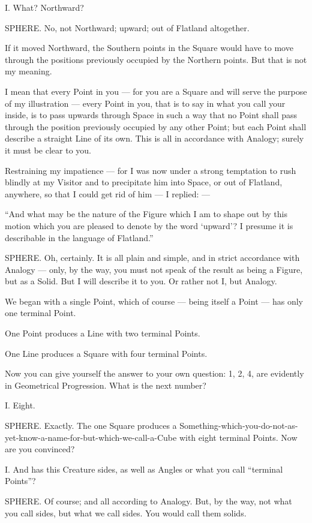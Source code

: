 \documentclass[12pt, a4paper, twoside]{memoir}
\begin{document}
I. What? Northward?

SPHERE. No, not Northward; upward; out of Flatland altogether.

If it moved Northward, the Southern points in the Square would have to move
through the positions previously occupied by the Northern points. But that is
not my meaning.

I mean that every Point in you --- for you are a Square and will serve the
purpose of my illustration --- every Point in you, that is to say in what you
call your inside, is to pass upwards through Space in such a way that no Point
shall pass through the position previously occupied by any other Point; but
each Point shall describe a straight Line of its own. This is all in
accordance with Analogy; surely it must be clear to you.

Restraining my impatience --- for I was now under a strong temptation to rush
blindly at my Visitor and to precipitate him into Space, or out of Flatland,
anywhere, so that I could get rid of him --- I replied: ---

``And what may be the nature of the Figure which I am to shape out by this
motion which you are pleased to denote by the word `upward'? I presume it is
describable in the language of Flatland.''

SPHERE. Oh, certainly. It is all plain and simple, and in strict accordance
with Analogy --- only, by the way, you must not speak of the result as being a
Figure, but as a Solid. But I will describe it to you. Or rather not I, but
Analogy.

We began with a single Point, which of course --- being itself a Point --- has
only one terminal Point.

One Point produces a Line with two terminal Points.

One Line produces a Square with four terminal Points.

Now you can give yourself the answer to your own question: 1, 2, 4, are
evidently in Geometrical Progression. What is the next number?

I. Eight.

SPHERE. Exactly. The one Square produces a
Something-which-you-do-not-as-yet-know-a-name-for-but-which-we-call-a-Cube
with eight terminal Points. Now are you convinced?

I. And has this Creature sides, as well as Angles or what you call ``terminal
Points''?

SPHERE. Of course; and all according to Analogy. But, by the way, not what you
call sides, but what we call sides. You would call them solids.
\end{document}
